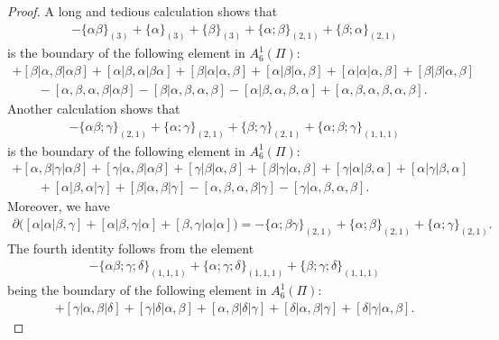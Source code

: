 \documentclass[10pt,a4paper]{amsart}
\numberwithin{equation}{section}
\begin{document}
\begin{proof}
 A long and tedious calculation shows that
 \begin{align*}
 -\{\alpha\beta\}_{(3)}+\{\alpha\}_{(3)}+\{\beta\}_{(3)}+\{\alpha;\beta\}_{(2,1)}+\{\beta;\alpha\}_{(2,1)}
 \end{align*}
 is the boundary of the following element in $A_{6}^1(\Pi)$:
 \begin{gather*}
 [\alpha,\beta|\alpha\beta|\alpha \beta]+[\beta|\alpha,\beta|\alpha \beta]+[\alpha|\beta,\alpha|\beta\alpha]+[\beta|\alpha|\alpha,\beta]+[\alpha|\beta|\alpha,\beta]+[\alpha|\alpha|\alpha,\beta]+[\beta|\beta|\alpha,\beta]\\
 \qquad{}-[\alpha,\beta,\alpha,\beta|\alpha\beta]-[\beta|\alpha,\beta,\alpha,\beta]-[\alpha|\beta,\alpha,\beta,\alpha]
 +[\alpha,\beta,\alpha,\beta,\alpha,\beta].
 \end{gather*}
 Another calculation shows that
 \begin{align*}
 -\{\alpha\beta;\gamma\}_{(2,1)}+\{\alpha;\gamma\}_{(2,1)}+\{\beta;\gamma\}_{(2,1)}+\{\alpha;\beta;\gamma\}_{(1,1,1)}
 \end{align*}
 is the boundary of the following element in $A_{6}^1(\Pi)$:
 \begin{gather*}
 [\alpha,\beta|\alpha\beta|\gamma]+[\alpha,\beta|\gamma|\alpha\beta]+[\gamma|\alpha,\beta|\alpha\beta]+[\gamma|\beta|\alpha,\beta]
 +[\beta|\gamma|\alpha,\beta]+[\gamma|\alpha|\beta,\alpha]+[\alpha|\gamma|\beta,
 \alpha]\\
 \qquad{}+[\alpha|\beta,\alpha|\gamma]+[\beta|\alpha,\beta|\gamma]-[\alpha,\beta,\alpha,\beta|\gamma]-[\gamma|\alpha,\beta,\alpha,\beta].
 \end{gather*}
 Moreover, we have
 \begin{align*}
 \partial \big([\alpha|\alpha|\beta,\gamma]+[\alpha|\beta,\gamma|\alpha]+[\beta,\gamma|\alpha|\alpha] \big)= -\{\alpha;\beta\gamma\}_{(2,1)}+\{\alpha;\beta\}_{(2,1)}+\{\alpha;\gamma\}_{(2,1)}.
 \end{align*}
 The fourth identity follows from the element
 \begin{align*}
 -\{\alpha\beta;\gamma;\delta\}_{(1,1,1)}+\{\alpha;\gamma;\delta\}_{(1,1,1)}+\{\beta;\gamma;\delta\}_{(1,1,1)}
 \end{align*}
 being the boundary of the following element in $A_{6}^1(\Pi)$:
 \begin{gather*}
 [\alpha,\beta|\gamma|\delta]+[\gamma|\alpha,\beta|\delta]+[\gamma|\delta|\alpha,\beta]+[\alpha,\beta|\delta|\gamma]+[\delta|\alpha,\beta|\gamma]+[\delta|\gamma|\alpha,\beta].

\end{gather*}
\end{proof}
\end{document}
